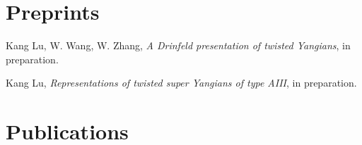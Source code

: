 \documentclass[11pt,letterpaper,roman,colorlinks,urlcolor=teal,linkcolor=teal]{moderncv} %
\begin{document}
\section{Preprints}

\begin{etaremune}[leftmargin=1cm]




\item Kang Lu, W. Wang, W. Zhang, {\textit{A Drinfeld presentation of twisted Yangians}}, in preparation.

\item Kang Lu, {\textit{Representations of twisted super Yangians of type AIII}}, in preparation.



\end{etaremune}
\section{Publications}
\end{document}
